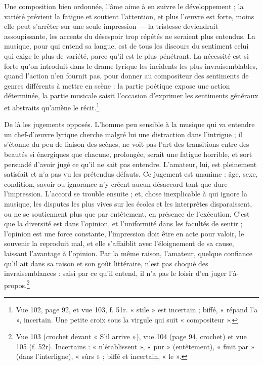 \documentclass[11pt,a4paper]{article}
\begin{document}
Une composition bien ordonnée, l'âme aime à en suivre le développement ; la
variété prévient la fatigue et soutient l'attention, et plus l'œuvre est forte,
moins elle peut s'arrêter sur une seule impression — la tristesse deviendrait
assoupissante, les accents du désespoir trop répétés ne seraient plus entendus.
La musique, pour qui entend sa langue, est de tous les discours du sentiment celui
qui exige le plus de variété, parce qu'il est le plus pénétrant. La nécessité est
si forte qu'on introduit dans le drame lyrique les incidents les plus
invraisemblables, quand l'action n'en fournit pas, pour donner au compositeur des
sentiments de genres différents à mettre en scène : la partie poétique expose une
action déterminée, la partie musicale saisit l'occasion d'exprimer les sentiments
généraux et abstraits qu'amène le récit.\footnote{Vue 102, page 92, et vue 103,
f. 51r. « stile » est incertain ; biffé, « répand l'a », incertain. Une petite
croix sous la virgule qui suit « compositeur ».}

De là les jugements opposés. L'homme peu sensible à la musique qui va entendre un
chef-d'œuvre lyrique cherche malgré lui une distraction dans l'intrigue ; il
s'étonne du peu de liaison des scènes, ne voit pas l'art des transitions entre des
beautés si énergiques que chacune, prolongée, serait une fatigue horrible, et
sort persuadé d'avoir jugé ce qu'il ne sait pas entendre. L'amateur, lui, est
pleinement satisfait et n'a pas vu les prétendus défauts. Ce jugement est
unanime : âge, sexe, condition, savoir ou ignorance n'y créent aucun désaccord
tant que dure l'impression. L'accord se trouble ensuite ; et, chose inexplicable
à qui ignore la musique, les disputes les plus vives sur les écoles et les
interprètes disparaissent, ou ne se soutiennent plus que par entêtement, en
présence de l'exécution. C'est que la diversité est dans l'opinion, et
l'uniformité dans les facultés de sentir ; l'opinion est une force constante,
l'impression doit être en acte pour valoir, le souvenir la reproduit mal, et elle
s'affaiblit avec l'éloignement de sa cause, laissant l'avantage à l'opinion. Par
la même raison, l'amateur, quelque confiance qu'il ait dans sa raison et son goût
littéraire, n'est pas choqué des invraisemblances : saisi par ce qu'il entend, il
n'a pas le loisir d'en juger l'à-propos.\footnote{Vue 103 (crochet devant « S'il
arrive »), vue 104 (page 94, crochet) et vue 105 (f. 52r). Incertains :
« n'établissent », « pur » (entêtement), « finit par » (dans l'interligne),
« sûrs » ; biffé et incertain, « le ».}
\end{document}
